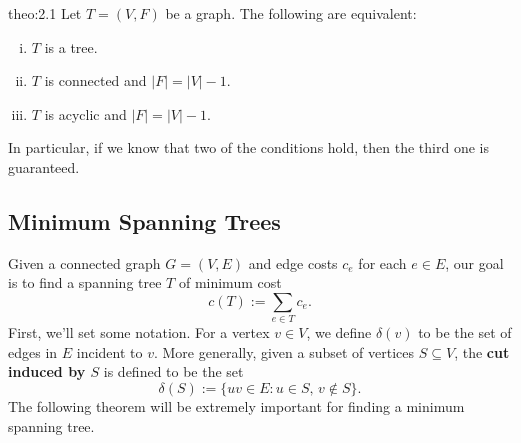 \begin{theo}{theo:2.1}
    Let $T = (V, F)$ be a graph. The following are equivalent:
    \begin{enumerate}[(i)]
        \item $T$ is a tree. 
        \item $T$ is connected and $|F| = |V| - 1$. 
        \item $T$ is acyclic and $|F| = |V| - 1$. 
    \end{enumerate}
\end{theo}

In particular, if we know that two of the conditions hold, then the 
third one is guaranteed.

\subsection{Minimum Spanning Trees}\label{subsec:2.2}
Given a connected graph $G = (V, E)$ and edge costs $c_e$ for each 
$e \in E$, our goal is to find a spanning tree $T$ of minimum cost 
\[ c(T) := \sum_{e \in T} c_e. \] 
First, we'll set some notation. For a vertex $v \in V$, we define 
$\delta(v)$ to be the set of edges in $E$ incident to $v$. More generally, 
given a subset of vertices $S \subseteq V$, the {\bf cut induced by $S$} is 
defined to be the set 
\[ \delta(S) := \{uv \in E : u \in S,\, v \notin S\}. \] 
The following theorem will be extremely important for finding a minimum 
spanning tree. 

